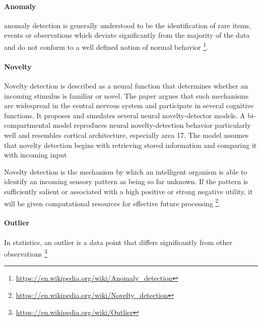 \documentclass{book}
\providecommand{\seeherefooter}[1]{\footnote{\url{#1}}}
\begin{document}
\paragraph{Anomaly}


anomaly detection is generally understood to be the identification of rare items, events or observations which deviate significantly from the majority of the data and do not conform to a well defined notion of normal behavior \seeherefooter{https://en.wikipedia.org/wiki/Anomaly_detection}.

\paragraph{Novelty}


Novelty detection is described as a neural function that determines whether an incoming stimulus is familiar or novel.
   The paper argues that such mechanisms are widespread in the central nervous system and participate in several cognitive functions. It proposes and simulates several neural novelty-detector models. A bi-compartmental model reproduces neural novelty-detection behavior particularly well and resembles cortical architecture, especially area 17. The model assumes that novelty detection begins with retrieving stored information and comparing it with incoming input \cite{salu-1988-models-of-neural-novelty-detectors-with-similarities-to-cerebral-cortex}

   Novelty detection is the mechanism by which an intelligent organism is able to identify an incoming sensory pattern as being so far unknown. If the pattern is sufficiently salient or associated with a high positive or strong negative utility, it will be given computational resources for effective future processing \seeherefooter{https://en.wikipedia.org/wiki/Novelty_detection}.

\paragraph{Outlier}


In statistics, an outlier is a data point that differs significantly from other observations \seeherefooter{https://en.wikipedia.org/wiki/Outlier}
\end{document}
